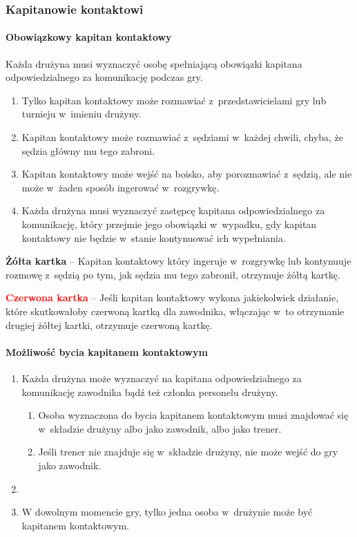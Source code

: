 \documentclass[12pt,a4paper]{article}
\newcommand\redcard[1]{\bgroup\textcolor{red}{\textbf{#1}}}
\newcommand\yellowcard[1]{\bgroup\textcolor{darkyellow}{\textbf{#1}}}
\begin{document}
\subsubsection{Kapitanowie kontaktowi}

\paragraph{Obowiązkowy kapitan kontaktowy}
Każda drużyna musi wyznaczyć
osobę spełniającą obowiązki kapitana odpowiedzialnego za komunikację
podczas gry.

\begin{enumerate}
	\item Tylko kapitan kontaktowy może rozmawiać z~przedstawicielami gry lub
	      turnieju w~imieniu drużyny.

	\item Kapitan kontaktowy może rozmawiać z~sędziami w~każdej chwili, chyba,
	      że sędzia główny mu tego zabroni.

	\item Kapitan kontaktowy może wejść na boisko, aby porozmawiać z~sędzią,
	      ale nie może w~żaden sposób ingerować w~rozgrywkę.

	\item Każda drużyna musi wyznaczyć zastępcę kapitana odpowiedzialnego za
	      komunikację, który przejmie jego obowiązki w~wypadku, gdy kapitan
	      kontaktowy nie będzie w~stanie kontynuować ich wypełniania.
\end{enumerate}

\yellowcard{Żółta kartka} -- Kapitan kontaktowy który ingeruje w~rozgrywkę lub
kontynuuje rozmowę z~sędzią po tym, jak sędzia mu tego zabronił,
otrzymuje żółtą kartkę.

\redcard{Czerwona kartka} -- Jeśli kapitan kontaktowy wykona jakiekolwiek
działanie, które skutkowałoby czerwoną kartką dla zawodnika, włączając w~to otrzymanie drugiej żółtej kartki, otrzymuje czerwoną kartkę.

\paragraph{Możliwość bycia kapitanem kontaktowym}

\begin{enumerate}
	\item
	      Każda drużyna może wyznaczyć na kapitana odpowiedzialnego za
	      komunikację zawodnika bądź też członka personelu drużyny.

	      \begin{enumerate}
		      \item
		            Osoba wyznaczona do bycia kapitanem kontaktowym musi znajdować się w~składzie drużyny albo jako zawodnik, albo jako trener.
		      \item
		            Jeśli trener nie znajduje się w~składzie drużyny, nie może wejść do
		            gry jako zawodnik.
	      \end{enumerate}
	\item
	\item W dowolnym momencie gry, tylko jedna osoba w~drużynie może być
	      kapitanem kontaktowym.
\end{enumerate}
\end{document}
